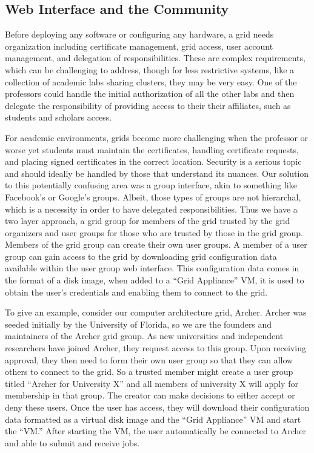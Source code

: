 \documentclass[twocolumn]{svjour3}
\begin{document}
\subsection{Web Interface and the Community}

Before deploying any software or configuring any hardware, a grid needs
organization including certificate management, grid access, user account
management, and delegation of responsibilities.  These are complex
requirements, which can be challenging to address, though for less restrictive
systems, like a collection of academic labs sharing clusters, they may be very
easy.  One of the professors could handle the initial authorization of all the
other labs and then delegate the responsibility of providing access to their
their affiliates, such as students and scholars access.

For academic environments, grids become more challenging when the professor or
worse yet students must maintain the certificates, handling certificate
requests, and placing signed certificates in the correct location.  Security is
a serious topic and should ideally be handled by those that understand its
nuances.  Our solution to this potentially confusing area was a group
interface, akin to something like Facebook's or Google's groups.  Albeit, those
types of groups are not hierarchal, which is a necessity in order to have
delegated responsibilities.  Thus we have a two layer approach, a grid group
for members of the grid trusted by the grid organizers and user groups for
those who are trusted by those in the grid group.  Members of the grid group
can create their own user groups.  A member of a user group can gain access to
the grid by downloading grid configuration data available within the user group
web interface.  This configuration data comes in the format of a disk image,
when added to a ``Grid Appliance'' VM, it is used to obtain the user's
credentials and enabling them to connect to the grid.

To give an example, consider our computer architecture grid, Archer.  Archer
was seeded initially by the University of Florida, so we are the founders and
maintainers of the Archer grid group.  As new universities and independent
researchers have joined Archer, they request access to this group.  Upon
receiving approval, they then need to form their own user group so that they
can allow others to connect to the grid.  So a trusted member might create a
user group titled ``Archer for University X'' and all members of university X
will apply for membership in that group.  The creator can make decisions to
either accept or deny these users.  Once the user has access, they will
download their configuration data formatted as a virtual disk image and the
``Grid Appliance'' VM and start the ``VM.''  After starting the VM, the user
automatically be connected to Archer and able to submit and receive jobs.
\end{document}
